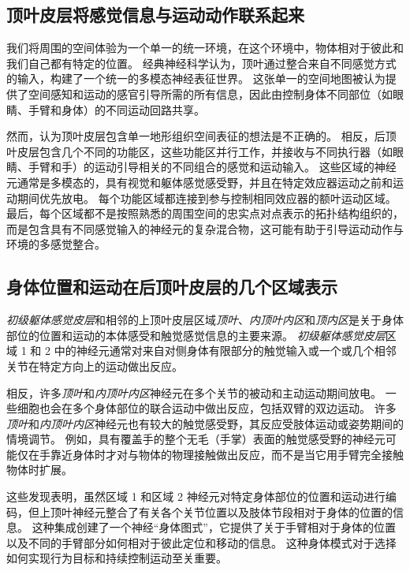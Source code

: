 \subsection{顶叶皮层将感觉信息与运动动作联系起来}

我们将周围的空间体验为一个单一的统一环境，在这个环境中，物体相对于彼此和我们自己都有特定的位置。
经典神经科学认为，顶叶通过整合来自不同感觉方式的输入，构建了一个统一的多模态神经表征世界。
这张单一的空间地图被认为提供了空间感知和运动的感官引导所需的所有信息，因此由控制身体不同部位（如眼睛、手臂和身体）的不同运动回路共享。


然而，认为顶叶皮层包含单一地形组织空间表征的想法是不正确的。
相反，后顶叶皮层包含几个不同的功能区，这些功能区并行工作，并接收与不同执行器（如眼睛、手臂和手）的运动引导相关的不同组合的感觉和运动输入。
这些区域的神经元通常是多模态的，具有视觉和躯体感觉感受野，并且在特定效应器运动之前和运动期间优先放电。
每个功能区域都连接到参与控制相同效应器的额叶运动区域。
最后，每个区域都不是按照熟悉的周围空间的忠实点对点表示的拓扑结构组织的，而是包含具有不同感觉输入的神经元的复杂混合物，这可能有助于引导运动动作与环境的多感觉整合。



\subsection{身体位置和运动在后顶叶皮层的几个区域表示}

\textit{初级躯体感觉皮层}和相邻的上顶叶皮层区域\textit{顶叶}、\textit{内顶叶内区}和\textit{顶内区}是关于身体部位的位置和运动的本体感受和触觉感觉信息的主要来源。
\textit{初级躯体感觉皮层}区域 1 和 2 中的神经元通常对来自对侧身体有限部分的触觉输入或一个或几个相邻关节在特定方向上的运动做出反应。


相反，许多\textit{顶叶}和\textit{内顶叶内区}神经元在多个关节的被动和主动运动期间放电。
一些细胞也会在多个身体部位的联合运动中做出反应，包括双臂的双边运动。
许多\textit{顶叶}和\textit{内顶叶内区}神经元也有较大的触觉感受野，其反应受肢体运动或姿势期间的情境调节。
例如，具有覆盖手的整个无毛（手掌）表面的触觉感受野的神经元可能仅在手靠近身体时才对与物体的物理接触做出反应，而不是当它用手臂完全接触物体时扩展。


这些发现表明，虽然区域 1 和区域 2 神经元对特定身体部位的位置和运动进行编码，但上顶叶神经元整合了有关各个关节位置以及肢体节段相对于身体的位置的信息。
这种集成创建了一个神经“身体图式”，它提供了关于手臂相对于身体的位置以及不同的手臂部分如何相对于彼此定位和移动的信息。
这种身体模式对于选择如何实现行为目标和持续控制运动至关重要。


